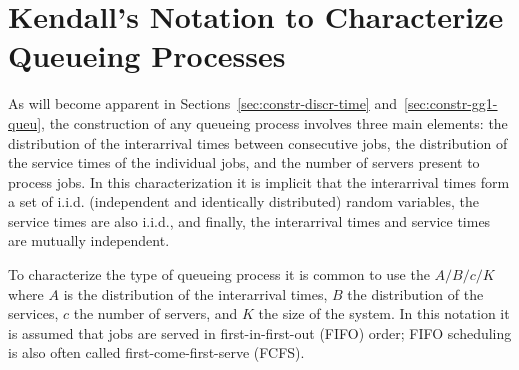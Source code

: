 
\section{Kendall's Notation to Characterize Queueing Processes}
\label{sec:kendalls-notation}

As will become apparent in Sections~\ref{sec:constr-discr-time}
and~\ref{sec:constr-gg1-queu}, the construction of any queueing
process involves three main elements: the distribution of the
interarrival times between consecutive jobs, the distribution of the
service times of the individual jobs, and the number of servers
present to process jobs. In this characterization it is implicit that
the interarrival times form a set of i.i.d. (independent and
identically distributed) random variables, the service times are also
i.i.d., and finally, the interarrival times and service times are
mutually independent.

To characterize the type of queueing process it is common to use the
 $A/B/c/K$ where $A$ is the distribution of the
interarrival times, $B$ the distribution of the services, $c$ the
number of servers, and $K$ the size of the system. In this notation it
is assumed that jobs are served in first-in-first-out (FIFO) order;
FIFO scheduling is also often called first-come-first-serve (FCFS).

